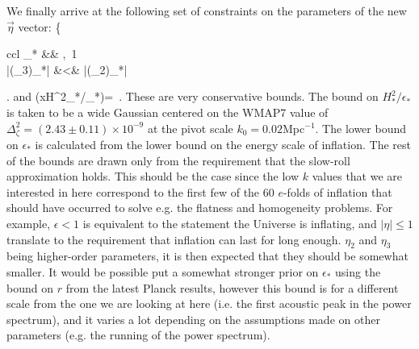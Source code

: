 \documentclass[useAMS,usenatbib,a4paper,onecolumn]{mn2e}
\begin{document}
We finally arrive at the following set of constraints on the parameters of the new $\vec{\eta}$ vector:
\be
\label{eq:priors}
	\left\{\begin{array}{ccl} %
	\epsilon_* &\varepsilon& \left[10^{-76},\, 1 \right[\\
	\eta_*  &\varepsilon& \left]-1,\, 1 \right[\\
	(\eta_2)_*  &\varepsilon& \left[-1,\, 1 \right]\\
	|(\eta_3)_*|  &<& |(\eta_2)_*|
	\end{array} \right.
\ee
and
\be
	(x\equiv H^2_*/\epsilon_*)=\exp\left[-\frac{1}{2}\frac{(x-(\mu=2.43))^2}{(\sigma=0.22)^2}�\right]\, .
\ee
These are very conservative bounds. The bound on $ H^2_*/\epsilon_*$ is taken to be a wide Gaussian centered on the WMAP7 value of $\Delta^2_\zeta=(2.43\pm0.11)\times10^{-9}$ at the pivot scale $k_0=0.02$Mpc$^{-1}$. The lower bound on $\epsilon_*$ is calculated from the lower bound on the energy scale of inflation. The rest of the bounds are drawn only from the requirement that the slow-roll approximation holds. This should be the case since the low $k$ values that we are interested in here correspond to the first few of the 60 $e$-folds of inflation that should have occurred to solve e.g. the flatness and homogeneity problems. For example, $\epsilon<1$ is equivalent to the statement the Universe is inflating, and $|\eta|\leq1$ translate to the requirement that inflation can last for long enough. $\eta_2$ and $\eta_3$ being higher-order parameters, it is then expected that they should be somewhat smaller. It would be possible put a somewhat stronger prior on $\epsilon_*$ using the bound on $r$ from the latest Planck results, however this bound is for a different scale from the one we are looking at here (i.e. the first acoustic peak in the power spectrum), and it varies a lot depending on the assumptions made on other parameters (e.g. the running of the power spectrum).

\bigskip
\end{document}
